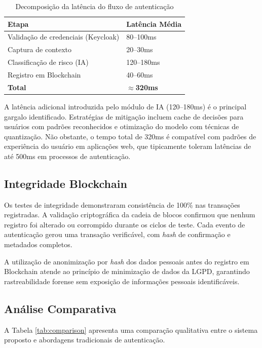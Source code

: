 \documentclass[12pt,a4paper]{article}
\begin{document}
\begin{table}[H]
\centering
\caption{Decomposição da latência do fluxo de autenticação}
\label{tab:latency}
\begin{tabular}{@{}ll@{}}
\toprule
\textbf{Etapa} & \textbf{Latência Média} \\
\midrule
Validação de credenciais (Keycloak)      & 80--100ms \\
Captura de contexto                       & 20--30ms \\
Classificação de risco (IA)               & 120--180ms \\
Registro em Blockchain                    & 40--60ms \\
\midrule
\textbf{Total}                            & \textbf{$\approx$320ms} \\
\bottomrule
\end{tabular}
\end{table}

A latência adicional introduzida pelo módulo de IA (120--180ms) é o principal gargalo identificado. Estratégias de mitigação incluem cache de decisões para usuários com padrões reconhecidos e otimização do modelo com técnicas de quantização. Não obstante, o tempo total de 320ms é compatível com padrões de experiência do usuário em aplicações web, que tipicamente toleram latências de até 500ms em processos de autenticação.

\subsection{Integridade Blockchain}

Os testes de integridade demonstraram consistência de 100\% nas transações registradas. A validação criptográfica da cadeia de blocos confirmou que nenhum registro foi alterado ou corrompido durante os ciclos de teste. Cada evento de autenticação gerou uma transação verificável, com \textit{hash} de confirmação e metadados completos.

A utilização de anonimização por \textit{hash} dos dados pessoais antes do registro em Blockchain atende ao princípio de minimização de dados da LGPD, garantindo rastreabilidade forense sem exposição de informações pessoais identificáveis.

\subsection{Análise Comparativa}

A Tabela \ref{tab:comparison} apresenta uma comparação qualitativa entre o sistema proposto e abordagens tradicionais de autenticação.
\end{document}
